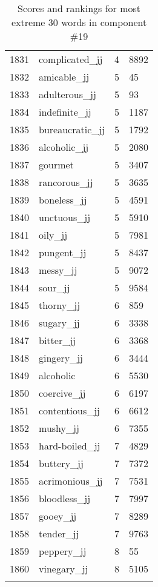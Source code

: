\begin{longtable}[!htbp]{| rlr@{.}l |}
    1831 & complicated\_jj & 4 & 8892 \\
    1832 & amicable\_jj & 5 & 45 \\
    1833 & adulterous\_jj & 5 & 93 \\
    1834 & indefinite\_jj & 5 & 1187 \\
    1835 & bureaucratic\_jj & 5 & 1792 \\
    1836 & alcoholic\_jj & 5 & 2080 \\
    1837 & gourmet & 5 & 3407 \\
    1838 & rancorous\_jj & 5 & 3635 \\
    1839 & boneless\_jj & 5 & 4591 \\
    1840 & unctuous\_jj & 5 & 5910 \\
    1841 & oily\_jj & 5 & 7981 \\
    1842 & pungent\_jj & 5 & 8437 \\
    1843 & messy\_jj & 5 & 9072 \\
    1844 & sour\_jj & 5 & 9584 \\
    1845 & thorny\_jj & 6 & 859 \\
    1846 & sugary\_jj & 6 & 3338 \\
    1847 & bitter\_jj & 6 & 3368 \\
    1848 & gingery\_jj & 6 & 3444 \\
    1849 & alcoholic & 6 & 5530 \\
    1850 & coercive\_jj & 6 & 6197 \\
    1851 & contentious\_jj & 6 & 6612 \\
    1852 & mushy\_jj & 6 & 7355 \\
    1853 & hard-boiled\_jj & 7 & 4829 \\
    1854 & buttery\_jj & 7 & 7372 \\
    1855 & acrimonious\_jj & 7 & 7531 \\
    1856 & bloodless\_jj & 7 & 7997 \\
    1857 & gooey\_jj & 7 & 8289 \\
    1858 & tender\_jj & 7 & 9763 \\
    1859 & peppery\_jj & 8 & 55 \\
    1860 & vinegary\_jj & 8 & 5105 \\
    \hline
    \caption{Scores and rankings for most extreme 30 words in component \#19} \\
\end{longtable}
